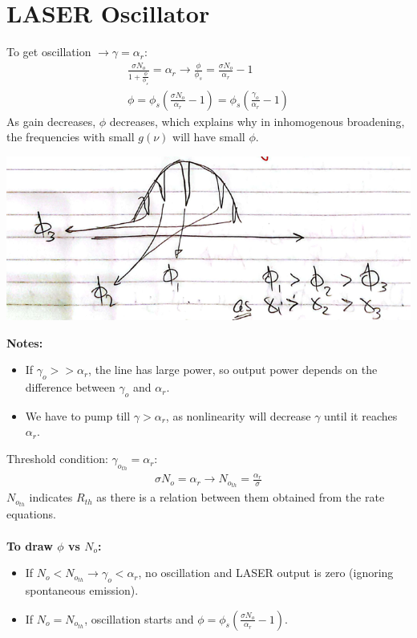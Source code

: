 \documentclass[11pt]{article}
\begin{document}
\section{LASER Oscillator}
To get oscillation $\rightarrow \gamma = \alpha_r$:
\begin{align*}
    \frac{\sigma N_o}{1 + \frac{\phi}{\phi_s}} = \alpha_r \rightarrow \frac{\phi}{\phi_s} = \frac{\sigma N_o}{\alpha_r} - 1 \\
    \phi = \phi_s \left( \frac{\sigma N_o}{\alpha_r} - 1 \right) = \phi_s \left( \frac{\gamma_o}{\alpha_r} - 1 \right)
\end{align*}
As gain decreases, $\phi$ decreases, which explains why in inhomogenous broadening, the frequencies with small $g(\nu)$ will have small $\phi$.
\begin{center}
    \includegraphics[scale=0.8]{6.png}
\end{center}
\textbf{Notes:} 
\begin{itemize}
    \item If $\gamma_o >> \alpha_r$, the line has large power, so output power depends on the difference between $\gamma_o$ and $\alpha_r$.
    \item We have to pump till $\gamma > \alpha_r$, as nonlinearity will decrease $\gamma$ until it reaches $\alpha_r$.
\end{itemize}
Threshold condition: $\gamma_{o_{th}} = \alpha_r$:
\begin{align*}
    \sigma N_o = \alpha_r \rightarrow N_{o_{th}} = \frac{\alpha_r}{\sigma}
\end{align*}
$N_{o_{th}}$ indicates $R_{th}$ as there is a relation between them obtained from the rate equations. \\ \\
\textbf{To draw $\phi$ vs $N_o$:}
\begin{itemize}
    \item If $N_o < N_{o_{th}} \rightarrow \gamma_o < \alpha_r$, no oscillation and LASER output is zero (ignoring spontaneous emission).
    \item If $N_o = N_{o_{th}}$, oscillation starts and $\phi = \phi_s \left( \frac{\sigma N_o}{\alpha_r} - 1 \right)$.
\end{itemize}
\end{document}
